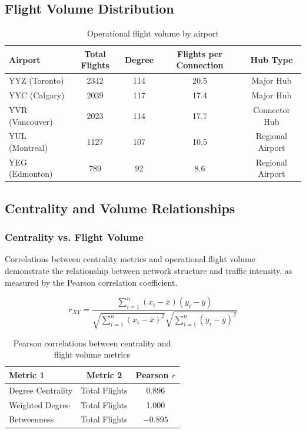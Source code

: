 \documentclass[9pt]{article}
\begin{document}
\subsection{Flight Volume Distribution}

\begin{table}[h!]
    \centering
    \caption{Operational flight volume by airport}
    \begin{tabular}{lcccc}
        \toprule
        Airport & Total Flights & Degree & Flights per Connection & Hub Type \\
        \midrule
        YYZ (Toronto)   & 2342 & 114 & 20.5 & Major Hub \\
        YYC (Calgary)   & 2039 & 117 & 17.4 & Major Hub \\
        YVR (Vancouver) & 2023 & 114 & 17.7 & Connector Hub \\
        YUL (Montreal)  & 1127 & 107 & 10.5 & Regional Airport \\
        YEG (Edmonton)  & 789  & 92  & 8.6  & Regional Airport \\
        \bottomrule
    \end{tabular}
\end{table}

\subsection{Centrality and Volume Relationships}

\subsubsection{Centrality vs. Flight Volume}

Correlations between centrality metrics and operational flight volume demonstrate the relationship between network structure and traffic intensity, as measured by the Pearson correlation coefficient.

\[
r_{XY}
=
\frac{\displaystyle\sum_{i=1}^{n} (x_i - \bar{x})(y_i - \bar{y})}
     {\sqrt{\displaystyle\sum_{i=1}^{n} (x_i - \bar{x})^2}
      \sqrt{\displaystyle\sum_{i=1}^{n} (y_i - \bar{y})^2}}
\]

\begin{table}[h!]
    \centering
    \caption{Pearson correlations between centrality and flight volume metrics}
    \begin{tabular}{lcc}
        \toprule
        Metric 1 & Metric 2 & Pearson $r$ \\
        \midrule
        Degree Centrality & Total Flights      & 0.896 \\
        Weighted Degree   & Total Flights      & 1.000 \\
        Betweenness       & Total Flights      & $-0.895$ \\
        \bottomrule
    \end{tabular}
\end{table}
\end{document}
